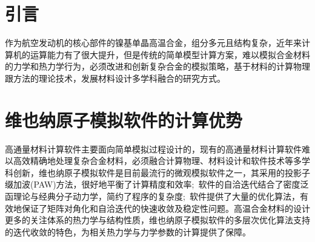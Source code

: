 \section{引言}
作为航空发动机的核心部件的镍基单晶高温合金，组分多元且结构复杂，近年来计算机的运算能力有了很大提升，但是传统的简单模型计算方案，难以模拟合金材料的力学和热力学行为，必须改进和创新复杂合金的模拟策略，基于材料的计算物理跟方法的理论技术，发展材料设计多学科融合的研究方式。

\section{维也纳原子模拟软件的计算优势}
高通量材料计算软件主要面向简单模拟过程设计的，现有的高通量材料计算软件难以高效精确地处理复杂合金材料，必须融合计算物理、材料设计和软件技术等多学科创新，维也纳原子模拟软件是目前最流行的微观模拟软件之一，其采用的投影子缀加波\textrm{(PAW)}方法，很好地平衡了计算精度和效率;~软件的自洽迭代结合了密度泛函理论与经典分子动力学，简约了程序的复杂度;~软件提供了大量的优化算法，有效地保证了矩阵对角化和自洽迭代的快速收敛及稳定性问题。高温合金材料的设计更多的关注体系的热力学与结构性质，维也纳原子模拟软件的多层次优化算法支持的迭代收敛的特色，为相关热力学与力学参数的计算提供了保障。%

